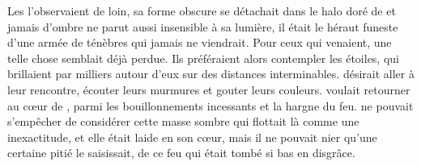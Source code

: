 Les \Ea l'observaient de loin, sa forme obscure se détachait dans le halo doré de \Naos et jamais d'ombre ne parut aussi insensible à sa lumière, il était le héraut funeste d'une armée de ténèbres qui jamais ne viendrait. Pour ceux qui venaient, une telle chose semblait déjà perdue. Ils préféraient alors contempler les étoiles, qui brillaient par milliers autour d'eux sur des distances interminables. \Nio désirait aller à leur rencontre, écouter leurs murmures et gouter leurs couleurs. \Fercor voulait retourner au cœur de \Naos, parmi les bouillonnements incessants et la hargne  du feu. \Oros ne pouvait s'empêcher de considérer cette masse sombre qui flottait là comme une inexactitude, et elle était laide en son cœur, mais il ne pouvait nier qu'une certaine pitié le saisissait, de ce feu qui était tombé si bas en disgrâce.         






